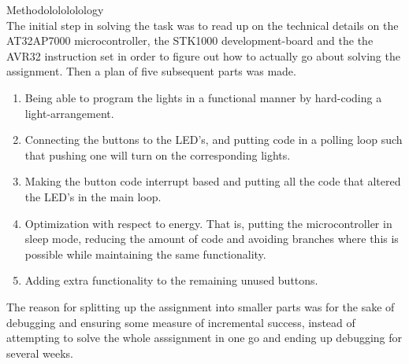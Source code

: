 Methodololololology\\
The initial step in solving the task was to read up on the technical details on the AT32AP7000 microcontroller, the STK1000 development-board and the the AVR32 instruction set in order to figure out how to actually go about solving the assignment. Then a plan of five subsequent parts was made.
\begin{enumerate}
\item{Being able to program the lights in a functional manner by hard-coding a light-arrangement.}
\item{Connecting the buttons to the LED's, and putting code in a polling loop such that pushing one will turn on the corresponding lights.}
\item{Making the button code interrupt based and putting all the code that altered the LED's in the main loop.}
\item{Optimization with respect to energy. That is, putting the microcontroller in sleep mode, reducing the amount of code and avoiding branches where this is possible while maintaining the same functionality.}
\item{Adding extra functionality to the remaining unused buttons.}
\end{enumerate}
The reason for splitting up the assignment into smaller parts was for the sake of debugging and ensuring some measure of incremental success, instead of attempting to solve the whole asssignment in one go and ending up debugging for several weeks.


